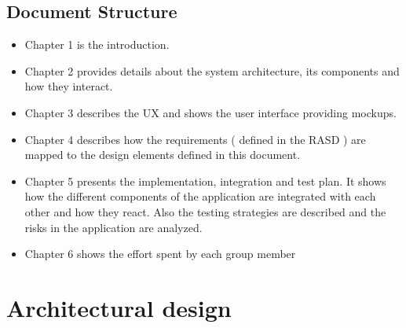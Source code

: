\documentclass{article}
\begin{document}
\subsection{Document Structure}
\begin{itemize}
	\item Chapter 1 is the introduction.
	\item Chapter 2 provides details about the system architecture, its components and how they interact.
	\item Chapter 3 describes the UX and shows the user interface providing mockups.
	\item Chapter 4 describes how the requirements ( defined in the RASD ) are mapped to the design elements defined in this document.
	\item Chapter 5 presents the implementation, integration and test plan. It shows how the different components of the application are integrated with each other and how they react. Also the testing strategies are described and the risks in the application are analyzed.
	\item Chapter 6 shows the effort spent by each group member
\end{itemize}

\newpage

\section{Architectural design}
\end{document}
